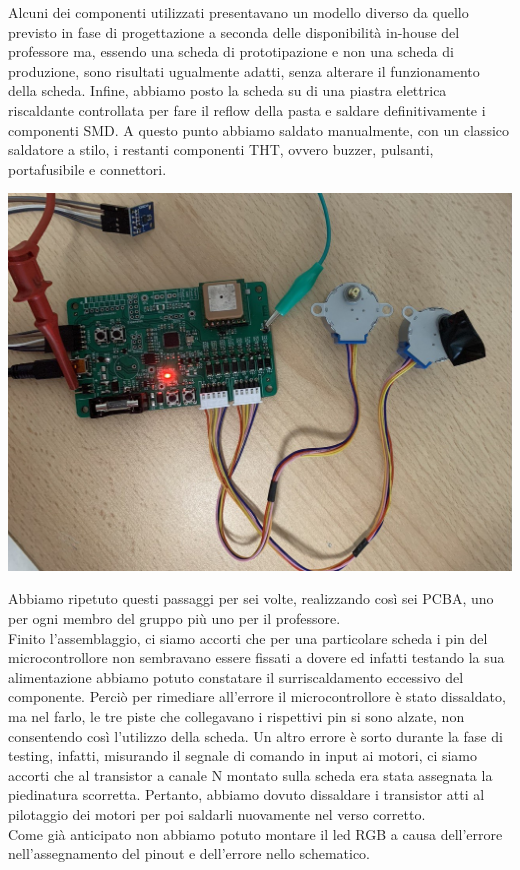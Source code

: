 \noindent Alcuni dei componenti utilizzati presentavano un modello diverso da quello previsto in fase di progettazione a seconda delle disponibilità in-house del professore ma, essendo una scheda di prototipazione e non una scheda di produzione, sono risultati ugualmente adatti, senza alterare il funzionamento della scheda. Infine, abbiamo posto la scheda su di una piastra elettrica riscaldante controllata per fare il reflow della pasta e saldare definitivamente i componenti SMD. A questo punto abbiamo saldato manualmente, con un classico saldatore a stilo, i restanti componenti THT, ovvero buzzer, pulsanti, portafusibile e connettori.

\begin{center}
\includegraphics[scale=0.35]{figures/image101.png}
\captionsetup{type=figure}
\end{center}

\noindent Abbiamo ripetuto questi passaggi per sei volte, realizzando così sei PCBA, uno per ogni membro del gruppo più uno per il professore.\\
Finito l’assemblaggio, ci siamo accorti che per una particolare scheda i pin del microcontrollore non sembravano 
essere fissati a dovere ed infatti testando la sua alimentazione abbiamo potuto constatare il surriscaldamento eccessivo 
del componente. Perciò per rimediare all’errore il microcontrollore è stato dissaldato, ma nel farlo, le tre piste che collegavano 
i rispettivi pin si sono alzate, non consentendo così l’utilizzo della scheda. Un altro errore è sorto durante la fase di testing, 
infatti, misurando il segnale di comando in input ai motori, ci siamo accorti che al transistor a canale N montato sulla scheda era 
stata assegnata la piedinatura scorretta. Pertanto, abbiamo dovuto dissaldare i transistor atti al pilotaggio dei motori per poi 
saldarli nuovamente nel verso corretto.\\
Come già anticipato non abbiamo potuto montare il led RGB a causa dell'errore nell'assegnamento del pinout e dell'errore nello schematico.

